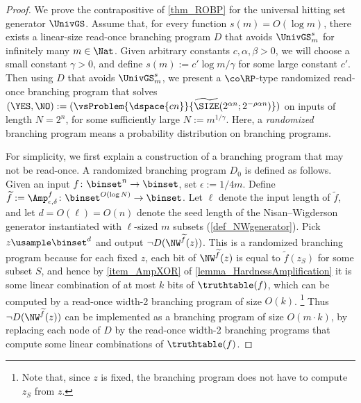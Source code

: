 \documentclass{toc}
\begin{document}
\begin{proof}
  We prove the contrapositive of \cref{thm_ROBP} for the universal hitting set generator $\UnivGS$.
  Assume that,
  for every function $s(m) = O(\log m)$,
  there exists a linear-size read-once branching program $D$ that avoids $\UnivGS_m^s$
  for infinitely many $m \in \Nat$.
  Given arbitrary constants $c, \alpha, \beta > 0$,
  we will choose a small constant $\gamma > 0$,
  and define $s(m) := c' \log m / \gamma$ for some large constant $c'$.
  Then using $D$ that avoids $\UnivGS_m^s$,
  we present a $\co\RP$-type randomized read-once branching program that solves
  $(\YES, \NO) := (\vsProblem{\dspace{cn}} { \widetilde{\SIZE}(2^{\alpha n}; 2^{- \rho \alpha n }) })$
  on inputs of length $N = 2^n$,
  for some sufficiently large $N := m^{1 / \gamma}$.
  Here, a \emph{randomized} branching program means a probability distribution on branching programs.

  For simplicity, we first explain a construction of a branching program that may not be read-once.
  A randomized branching program $D_0$ is defined as follows.
  Given an input $f \colon \binset^n \to \binset$,
  set $\epsilon := 1/4m$.
  Define ${\widetilde{f}} := \Amp_{\epsilon, \delta}^{f} \colon \binset^{O(\log N)} \to \binset$.
  Let $\ell$ denote the input length of ${\widetilde{f}}$,
  and let $d = O(\ell) = O(n)$ denote the seed length of the Nisan--Wigderson generator instantiated with $\ell$-sized $m$ subsets (\cref{def_NWgenerator}).
  Pick $z \usample \binset^d$
  and output $\neg D(\NW^{{\widetilde{f}}}(z))$.
  This is a randomized branching program because for each fixed $z$,
  each bit of $\NW^{\widetilde{f}}(z)$ is equal to ${\widetilde{f}}(z_{S})$ for some subset $S$,
  and hence by \cref{item_AmpXOR} of \cref{lemma_HardnessAmplification}
  it is some linear combination of at most $k$ bits of $\truthtable(f)$, which can be computed by a read-once width-2 branching program of size $O(k)$.%
  \footnote{Note that, since $z$ is fixed, the branching program does not have to compute $z_S$ from $z$.}
  Thus $\neg D(\NW^{{\widetilde{f}}}(z))$ can be implemented as a branching program of size $O(m \cdot k)$, by replacing each node of $D$ by the read-once width-2 branching programs that compute some linear combinations of $\truthtable(f)$.



\end{proof}
\end{document}
